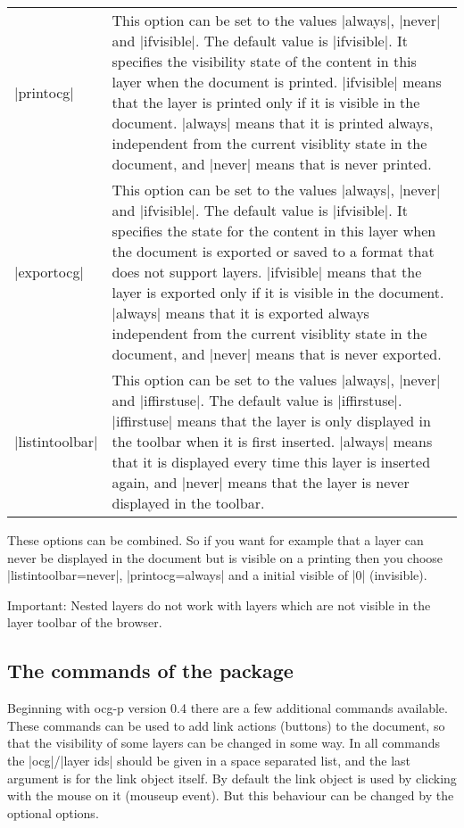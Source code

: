 \documentclass[a4paper]{ltxdoc}
\newcommand*{\pkg}[1]{\textsf{#1}}
\begin{document}
\begin{center}\begin{tabular}{lp{9cm}}\hline
|printocg| & This option can be set to the values |always|, |never| and |ifvisible|. The default value is |ifvisible|. It specifies the visibility state of the content in this layer when the document is printed. |ifvisible| means that the layer is printed only if it is visible in the document. |always| means that it is printed always, independent from the current visiblity state in the document, and |never| means that is never printed.\\
|exportocg| & This option can be set to the values |always|, |never| and |ifvisible|. The default value is |ifvisible|. It specifies the state for the content in this layer when the document is exported or saved to a format that does not support layers. |ifvisible| means that the layer is exported only if it is visible in the document.  |always| means that it is exported always independent from the current visiblity state in the document, and |never| means that is never exported.\\
|listintoolbar| & This option can be set to the values |always|, |never| and |iffirstuse|. The default value is |iffirstuse|. |iffirstuse| means that the layer is only displayed in the toolbar when it is first inserted. |always| means that it is displayed every time this layer is inserted again, and |never| means that the layer is never displayed in the toolbar.  \\ 
\hline
\end{tabular}\end{center}

These options can be combined. So if you want for example that a layer can never be displayed in the document but is visible on a printing then you choose |listintoolbar=never|, |printocg=always| and a initial visible of |0| (invisible).

Important: Nested layers do not work with layers which are not visible in the layer toolbar of the browser.

\subsection{The commands of the package}
Beginning with  \pkg{ocg-p} version 0.4 there are a few additional commands available. These commands can be used to add link actions (buttons) to the document, so that the visibility of some layers can be changed in some way. 
In all commands the |ocg|/|layer ids| should be given in a space separated list, and the last argument is for the link object itself.
By default the link object is used by clicking with the mouse on it (mouseup event). But this behaviour can be changed by the optional options. 
\end{document}
